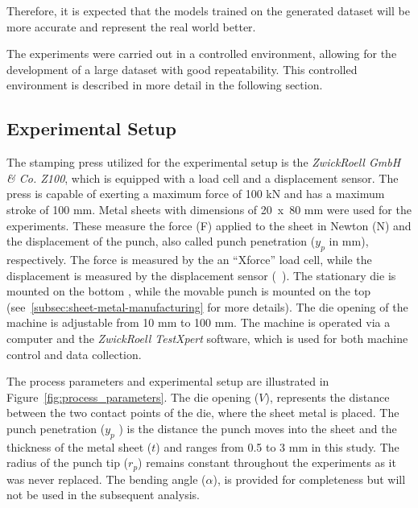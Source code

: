 Therefore, it is expected that the models trained on the generated dataset will be more accurate and represent the real
world better.

The experiments were carried out in a controlled environment, allowing for the development of a large dataset with
good repeatability.
This controlled environment is described in more detail in the following section.

\subsection{Experimental Setup}\label{subsec:experimental-setup}
The stamping press utilized for the experimental setup is the \textit{ZwickRoell GmbH \& Co. Z100}, which is
equipped with a load cell and a displacement sensor.
The press is capable of exerting a maximum force of 100 kN and has a maximum stroke of 100 mm.
Metal sheets with dimensions of 20~x~80 mm were used for the experiments.
These measure the force (F) applied to the sheet in Newton (N) and the displacement of the punch, also called
punch penetration ($y_p$ in mm), respectively.
The force is measured by the an ``Xforce'' load cell, while the displacement is measured by the displacement sensor
(~\cite{_xforceloadcell_}).
The stationary die is mounted on the bottom , while the movable punch is mounted on the top
(see~\cref{subsec:sheet-metal-manufacturing} for more details).
The die opening of the machine is adjustable from 10 mm to 100 mm.
The machine is operated via a computer and the \textit{ZwickRoell TestXpert} software, which is used for both machine
control and data collection.

The process parameters and experimental setup are illustrated in Figure~\ref{fig:process_parameters}.
The die opening ($V$), represents the distance between the two contact points of the die, where the sheet metal is
placed.
The punch penetration ($y_p$ ) is the distance the punch moves into the sheet and
the thickness of the metal sheet ($t$) and ranges from 0.5 to 3 mm in this study.
The radius of the punch tip ($r_p$) remains constant throughout the experiments as it was never replaced.
The bending angle ($\alpha$), is provided for completeness but will not be used in the subsequent analysis.

